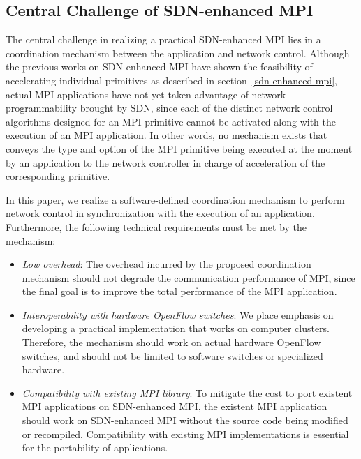 \hypertarget{central-challenge-of-sdn-enhanced-mpi}{%
\subsection{Central Challenge of SDN-enhanced
MPI}\label{central-challenge-of-sdn-enhanced-mpi}}

The central challenge in realizing a practical SDN-enhanced MPI lies in
a coordination mechanism between the application and network control.
Although the previous works on SDN-enhanced MPI have shown the
feasibility of accelerating individual primitives as described in
section~\ref{sdn-enhanced-mpi}, actual MPI applications have not yet
taken advantage of network programmability brought by SDN, since each of
the distinct network control algorithms designed for an MPI primitive
cannot be activated along with the execution of an MPI application. In
other words, no mechanism exists that conveys the type and option of the
MPI primitive being executed at the moment by an application to the
network controller in charge of acceleration of the corresponding
primitive.

In this paper, we realize a software-defined coordination mechanism to
perform network control in synchronization with the execution of an
application. Furthermore, the following technical requirements must be
met by the mechanism:

\begin{itemize}
\setlength{\itemsep}{1em}
\item
  \emph{Low overhead}: The overhead incurred by the proposed coordination
  mechanism should not degrade the communication performance of MPI, since the
  final goal is to improve the total performance of the MPI application.
\item
  \emph{Interoperability with hardware OpenFlow switches}: We place emphasis
  on developing a practical implementation that works on computer clusters.
  Therefore, the mechanism should work on actual hardware OpenFlow switches,
  and should not be limited to software switches or specialized hardware.
\item
  \emph{Compatibility with existing MPI library}: To mitigate the
  cost to port existent MPI applications on SDN-enhanced MPI, the existent MPI
  application should work on SDN-enhanced MPI without the source code being
  modified or recompiled. Compatibility with existing MPI implementations is
  essential for the portability of applications.
\end{itemize}


